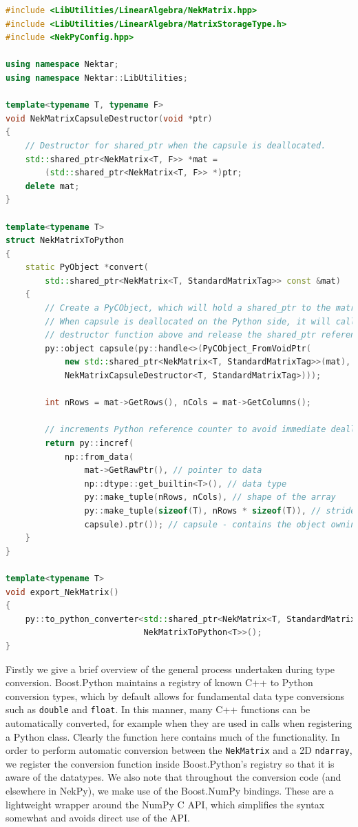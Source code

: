 \begin{lstlisting}[caption={Converter method for converting the C++ arrays into Python NumPy arrays.}, label={lst:c_to_python}, language=C++]
#include <LibUtilities/LinearAlgebra/NekMatrix.hpp>
#include <LibUtilities/LinearAlgebra/MatrixStorageType.h>
#include <NekPyConfig.hpp>

using namespace Nektar;
using namespace Nektar::LibUtilities;

template<typename T, typename F>
void NekMatrixCapsuleDestructor(void *ptr)
{
    // Destructor for shared_ptr when the capsule is deallocated.
    std::shared_ptr<NekMatrix<T, F>> *mat =
        (std::shared_ptr<NekMatrix<T, F>> *)ptr;
    delete mat;
}

template<typename T>
struct NekMatrixToPython
{
    static PyObject *convert(
        std::shared_ptr<NekMatrix<T, StandardMatrixTag>> const &mat)
    {
        // Create a PyCObject, which will hold a shared_ptr to the matrix.
        // When capsule is deallocated on the Python side, it will call the
        // destructor function above and release the shared_ptr reference.
        py::object capsule(py::handle<>(PyCObject_FromVoidPtr(
            new std::shared_ptr<NekMatrix<T, StandardMatrixTag>>(mat),
            NekMatrixCapsuleDestructor<T, StandardMatrixTag>)));

        int nRows = mat->GetRows(), nCols = mat->GetColumns();

        // increments Python reference counter to avoid immediate deallocation
        return py::incref( 
            np::from_data(
                mat->GetRawPtr(), // pointer to data
                np::dtype::get_builtin<T>(), // data type
                py::make_tuple(nRows, nCols), // shape of the array
                py::make_tuple(sizeof(T), nRows * sizeof(T)), // stride of the array
                capsule).ptr()); // capsule - contains the object owning the data (preventing it from being prematurely deallocated)
    }
}

template<typename T>
void export_NekMatrix()
{
    py::to_python_converter<std::shared_ptr<NekMatrix<T, StandardMatrixTag>>,
                            NekMatrixToPython<T>>();
}  
\end{lstlisting}

Firstly we give a brief overview of the general process undertaken during type
conversion. Boost.Python maintains a registry of known C++ to Python conversion
types, which by default allows for fundamental data type conversions such as
\texttt{double} and \texttt{float}. In this manner, many C++ functions can be
automatically converted, for example when they are used in  calls
when registering a Python class. Clearly the  function here
contains much of the functionality. In order to perform automatic conversion
between the \texttt{NekMatrix} and a 2D \texttt{ndarray}, we register the
conversion function inside Boost.Python's registry so that it is aware of the
datatypes. We also note that throughout the conversion code (and elsewhere in
NekPy), we make use of the Boost.NumPy bindings. These are a lightweight wrapper
around the NumPy C API, which simplifies the syntax somewhat and avoids direct
use of the API.

